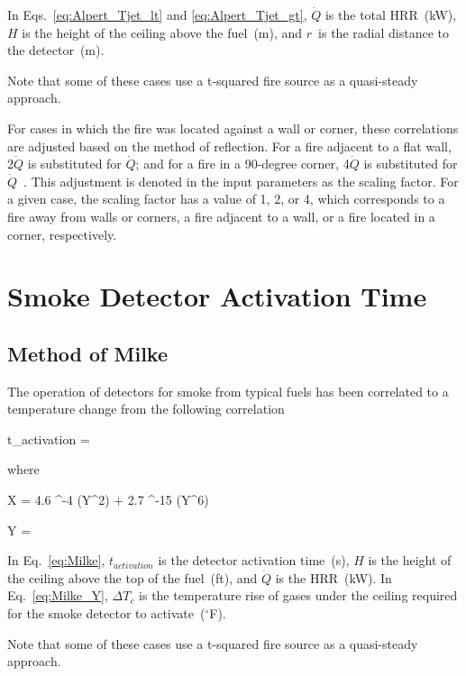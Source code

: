 In Eqs.~\ref{eq:Alpert_Tjet_lt} and \ref{eq:Alpert_Tjet_gt}, $\dot Q$ is the total HRR~(kW), $H$ is the height of the ceiling above the fuel~(m), and $r$~is the radial distance to the detector~(m).

Note that some of these cases use a t-squared fire source as a quasi-steady approach.

For cases in which the fire was located against a wall or corner, these correlations are adjusted based on the method of reflection. For a fire adjacent to a flat wall, 2$\dot Q$ is substituted for $\dot Q$; and for a fire in a 90-degree corner, 4$\dot Q$ is substituted for $\dot Q$~\cite{SFPE:Alpert}. This adjustment is denoted in the input parameters as the scaling factor. For a given case, the scaling factor has a value of 1, 2, or 4, which corresponds to a fire away from walls or corners, a fire adjacent to a wall, or a fire located in a corner, respectively.


\clearpage


\section{Smoke Detector Activation Time}

\subsection{Method of Milke}

The operation of detectors for smoke from typical fuels has been correlated to a temperature change from the following correlation

\be
t_{activation} = 
\label{eq:Milke}
\ee

\noindent where

\be
X = 4.6 ^{-4} (Y^2) + 2.7 ^{-15} (Y^6)
\label{eq:Milke_X}
\ee

\be
Y = 
\label{eq:Milke_Y}
\ee

In Eq.~\ref{eq:Milke}, $t_{activation}$ is the detector activation time~(s), $H$ is the height of the ceiling above the top of the fuel~(ft), and $\dot Q$ is the HRR~(kW). In Eq.~\ref{eq:Milke_Y}, $\Delta T_c$ is the temperature rise of gases under the ceiling required for the smoke detector to activate~($^\circ$F).

Note that some of these cases use a t-squared fire source as a quasi-steady approach.


\clearpage


